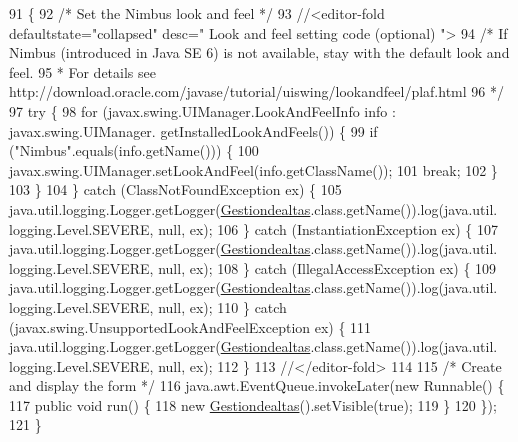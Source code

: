 \begin{DoxyCode}
91                                            \{
92         \textcolor{comment}{/* Set the Nimbus look and feel */}
93         \textcolor{comment}{//<editor-fold defaultstate="collapsed" desc=" Look and feel setting code (optional) ">}
94         \textcolor{comment}{/* If Nimbus (introduced in Java SE 6) is not available, stay with the default look and feel.}
95 \textcolor{comment}{         * For details see http://download.oracle.com/javase/tutorial/uiswing/lookandfeel/plaf.html }
96 \textcolor{comment}{         */}
97         \textcolor{keywordflow}{try} \{
98             \textcolor{keywordflow}{for} (javax.swing.UIManager.LookAndFeelInfo info : javax.swing.UIManager.
      getInstalledLookAndFeels()) \{
99                 \textcolor{keywordflow}{if} (\textcolor{stringliteral}{"Nimbus"}.equals(info.getName())) \{
100                     javax.swing.UIManager.setLookAndFeel(info.getClassName());
101                     \textcolor{keywordflow}{break};
102                 \}
103             \}
104         \} \textcolor{keywordflow}{catch} (ClassNotFoundException ex) \{
105             java.util.logging.Logger.getLogger(\mbox{\hyperlink{classsoftware_1_1_gestiondealtas_a00ba9520dbcc70ceaf94eccc527ea915}{Gestiondealtas}}.class.getName()).log(java.util.
      logging.Level.SEVERE, null, ex);
106         \} \textcolor{keywordflow}{catch} (InstantiationException ex) \{
107             java.util.logging.Logger.getLogger(\mbox{\hyperlink{classsoftware_1_1_gestiondealtas_a00ba9520dbcc70ceaf94eccc527ea915}{Gestiondealtas}}.class.getName()).log(java.util.
      logging.Level.SEVERE, null, ex);
108         \} \textcolor{keywordflow}{catch} (IllegalAccessException ex) \{
109             java.util.logging.Logger.getLogger(\mbox{\hyperlink{classsoftware_1_1_gestiondealtas_a00ba9520dbcc70ceaf94eccc527ea915}{Gestiondealtas}}.class.getName()).log(java.util.
      logging.Level.SEVERE, null, ex);
110         \} \textcolor{keywordflow}{catch} (javax.swing.UnsupportedLookAndFeelException ex) \{
111             java.util.logging.Logger.getLogger(\mbox{\hyperlink{classsoftware_1_1_gestiondealtas_a00ba9520dbcc70ceaf94eccc527ea915}{Gestiondealtas}}.class.getName()).log(java.util.
      logging.Level.SEVERE, null, ex);
112         \}
113         \textcolor{comment}{//</editor-fold>}
114 
115         \textcolor{comment}{/* Create and display the form */}
116         java.awt.EventQueue.invokeLater(\textcolor{keyword}{new} Runnable() \{
117             \textcolor{keyword}{public} \textcolor{keywordtype}{void} run() \{
118                 \textcolor{keyword}{new} \mbox{\hyperlink{classsoftware_1_1_gestiondealtas_a00ba9520dbcc70ceaf94eccc527ea915}{Gestiondealtas}}().setVisible(\textcolor{keyword}{true});
119             \}
120         \});
121     \}
\end{DoxyCode}


